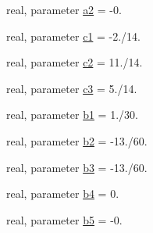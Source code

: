 \begin{DoxyCompactItemize}
\item 
real, parameter \hyperlink{classsw__core__mod_a29d1577650c0131c79a4d8f34d317b87}{a2} = -\/0.
\item 
real, parameter \hyperlink{classsw__core__mod_aa07fe9004d87c794dfe3f7593c96275f}{c1} = -\/2./14.
\item 
real, parameter \hyperlink{classsw__core__mod_a1be5c791573d2932b307ed6cdf52f2bc}{c2} = 11./14.
\item 
real, parameter \hyperlink{classsw__core__mod_ae6bff2a81849c99f2258c7e7cea943b0}{c3} = 5./14.
\item 
real, parameter \hyperlink{classsw__core__mod_a232f80cdeba816990b2606c04b5468a6}{b1} = 1./30.
\item 
real, parameter \hyperlink{classsw__core__mod_ae0c21e56d1941db4d7f16af5f24720c5}{b2} = -\/13./60.
\item 
real, parameter \hyperlink{classsw__core__mod_a53d9d5f60e77227069729364bf924ddb}{b3} = -\/13./60.
\item 
real, parameter \hyperlink{classsw__core__mod_a9f920cb428a38b9ad3294bb816b3b69a}{b4} = 0.
\item 
real, parameter \hyperlink{classsw__core__mod_a8e47d06abc48dd557c6a46a38871e58a}{b5} = -\/0.
\end{DoxyCompactItemize}
